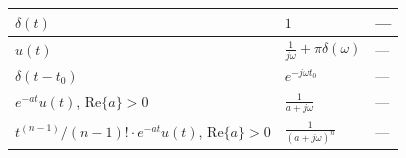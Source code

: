 \documentclass[8pt]{extarticle}
\begin{document}
\begin{table}[h]
\begin{tabular}{|l|l|l|}
        $\delta(t)$                                                & $1$                                                                                & —                                         \\ \hline
        $u(t)$                                                     & $\frac{1}{j\omega} + \pi \delta(\omega)$                                           & —                                         \\ \hline
        $\delta(t - t_0)$                                          & $e^{-j\omega t_0}$                                                                 & —                                         \\ \hline
        $e^{-a t} u(t)$, $\text{Re}\{a\}>0$                        & $\frac{1}{a + j\omega}$                                                            & —                                         \\ \hline
        $t^{(n-1)}/(n-1)! \cdot e^{-a t} u(t)$, $\text{Re}\{a\}>0$ & $\frac{1}{(a + j\omega)^n}$                                                        & —                                         \\ \hline
    \end{tabular}
\end{table}
\end{document}
